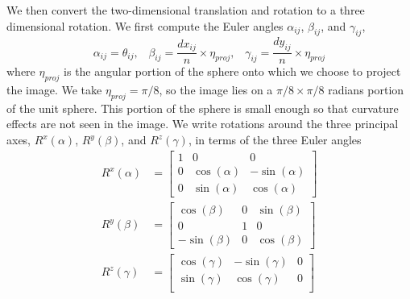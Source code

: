 \documentclass{pnastwo}
\begin{document}
\begin{article}
\begin{materials}
%
%
We then convert the two-dimensional translation and rotation to a three dimensional rotation. 
%
We first compute the Euler angles $\alpha_{ij}$, $\beta_{ij}$, and $\gamma_{ij}$,
\begin{equation} \label{eq:angle_relations}
	\alpha_{ij} = \theta_{ij}, \; \; \;
	\beta_{ij} = \frac{dx_{ij}}{n} \times \eta_{proj}, \; \; \;
	\gamma_{ij} = \frac{dy_{ij}}{n} \times \eta_{proj} 
\end{equation}
where $\eta_{proj}$ is the angular portion of the sphere onto which we choose to project the image.
%
We take $\eta_{proj} =  \pi/8$, so the image lies on a $\pi/8 \times \pi/8$ radians portion of the unit sphere.
%
This portion of the sphere is small enough so that curvature effects are not seen in the image.
%
We write rotations around the three principal axes, $R^x(\alpha)$, $R^y(\beta)$, and $R^z(\gamma)$, in terms of the three Euler angles
\begin{equation}
\begin{aligned}
	R^x(\alpha) &= \begin{bmatrix}
	1 & 0 & 0 \\
    0 & \cos(\alpha) & -\sin(\alpha) \\
    0 & \sin(\alpha) & \cos(\alpha)
	\end{bmatrix} \\
	R^y(\beta) &= \begin{bmatrix}
	\cos(\beta) & 0 & \sin(\beta) \\
    0 & 1 & 0 \\
    -\sin(\beta) & 0 & \cos(\beta)
    \end{bmatrix} \\
	R^z(\gamma) &= \begin{bmatrix} 
	\cos(\gamma) & -\sin(\gamma) & 0 \\
    \sin(\gamma) & \cos(\gamma) & 0 \\

\end{bmatrix}
\end{aligned}
\end{equation}
\end{materials}
\end{article}
\end{document}
